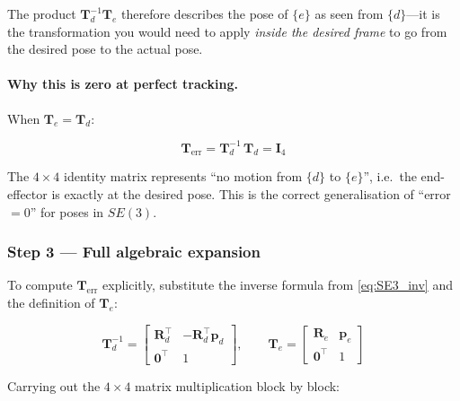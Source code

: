 The product $\mathbf{T}_d^{-1}\mathbf{T}_e$ therefore describes the
pose of $\{e\}$ as seen from $\{d\}$---it is the transformation you
would need to apply \emph{inside the desired frame} to go from the
desired pose to the actual pose.

\paragraph{Why this is zero at perfect tracking.}
When $\mathbf{T}_e = \mathbf{T}_d$:

\begin{equation}
\mathbf{T}_{\mathrm{err}}
= \mathbf{T}_d^{-1}\,\mathbf{T}_d
= \mathbf{I}_4
\end{equation}

The $4\times4$ identity matrix represents ``no motion from $\{d\}$ to
$\{e\}$'', i.e.\ the end-effector is exactly at the desired pose.
This is the correct generalisation of ``error $= 0$'' for poses in $SE(3)$.

\subsubsection*{Step 3 --- Full algebraic expansion}

To compute $\mathbf{T}_{\mathrm{err}}$ explicitly, substitute the
inverse formula from \cref{eq:SE3_inv} and the definition of
$\mathbf{T}_e$:

\begin{equation}
\mathbf{T}_d^{-1} =
\begin{bmatrix}
\mathbf{R}_d^\top & -\mathbf{R}_d^\top\mathbf{p}_d \\
\mathbf{0}^\top & 1
\end{bmatrix},
\qquad
\mathbf{T}_e =
\begin{bmatrix}
\mathbf{R}_e & \mathbf{p}_e \\
\mathbf{0}^\top & 1
\end{bmatrix}
\end{equation}

Carrying out the $4\times4$ matrix multiplication block by block:

